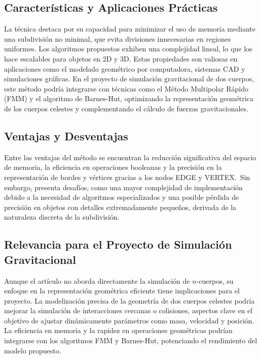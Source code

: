 \subsection{Características y Aplicaciones Prácticas}

La técnica destaca por su capacidad para minimizar el uso de memoria mediante una subdivisión no minimal, que evita divisiones innecesarias en regiones uniformes. Los algoritmos propuestos exhiben una complejidad lineal, lo que los hace escalables para objetos en 2D y 3D. Estas propiedades son valiosas en aplicaciones como el modelado geométrico por computadora, sistemas CAD y simulaciones gráficas. En el proyecto de simulación gravitacional de dos cuerpos, este método podría integrarse con técnicas como el Método Multipolar Rápido (FMM) y el algoritmo de Barnes-Hut, optimizando la representación geométrica de los cuerpos celestes y complementando el cálculo de fuerzas gravitacionales.

\subsection{Ventajas y Desventajas}

Entre las ventajas del método se encuentran la reducción significativa del espacio de memoria, la eficiencia en operaciones booleanas y la precisión en la representación de bordes y vértices gracias a los nodos EDGE y VERTEX.\ Sin embargo, presenta desafíos, como una mayor complejidad de implementación debido a la necesidad de algoritmos especializados y una posible pérdida de precisión en objetos con detalles extremadamente pequeños, derivada de la naturaleza discreta de la subdivisión.

\subsection{Relevancia para el Proyecto de Simulación Gravitacional}

Aunque el artículo no aborda directamente la simulación de \(n\)-cuerpos, su enfoque en la representación geométrica eficiente tiene implicaciones para el proyecto. La modelización precisa de la geometría de dos cuerpos celestes podría mejorar la simulación de interacciones cercanas o colisiones, aspectos clave en el objetivo de ajustar dinámicamente parámetros como masa, velocidad y posición. La eficiencia en memoria y la rapidez en operaciones geométricas podrían integrarse con los algoritmos FMM y Barnes-Hut, potenciando el rendimiento del modelo propuesto.

